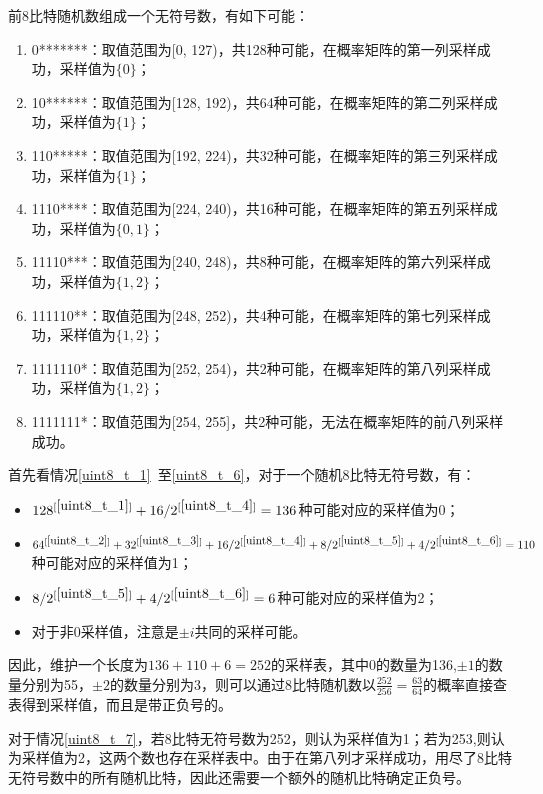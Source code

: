 \documentclass{article}
\begin{document}
	
	前8比特随机数组成一个无符号数，有如下可能：
	\begin{enumerate}
		\item 0*******：取值范围为[0, 127)，共128种可能，在概率矩阵的第一列采样成功，采样值为$\{0\}$；\label{uint8_t_1}
		\item 10******：取值范围为[128, 192)，共64种可能，在概率矩阵的第二列采样成功，采样值为$\{1\}$；\label{uint8_t_2}
		\item 110*****：取值范围为[192, 224)，共32种可能，在概率矩阵的第三列采样成功，采样值为$\{1\}$；\label{uint8_t_3}
		\item 1110****：取值范围为[224, 240)，共16种可能，在概率矩阵的第五列采样成功，采样值为$\{0, 1\}$；\label{uint8_t_4}
		\item 11110***：取值范围为[240, 248)，共8种可能，在概率矩阵的第六列采样成功，采样值为$\{1, 2\}$；\label{uint8_t_5}
		\item 111110**：取值范围为[248, 252)，共4种可能，在概率矩阵的第七列采样成功，采样值为$\{1, 2\}$；\label{uint8_t_6}
		\item 1111110*：取值范围为[252, 254)，共2种可能，在概率矩阵的第八列采样成功，采样值为$\{1, 2\}$；\label{uint8_t_7}
		\item 1111111*：取值范围为[254, 255]，共2种可能，无法在概率矩阵的前八列采样成功。\label{uint8_t_8}
	\end{enumerate}
	首先看情况\ref{uint8_t_1}~至\ref{uint8_t_6}，对于一个随机8比特无符号数，有：
	\begin{itemize}
		\item $128^{[\ref{uint8_t_1}]} + 16/2^{[\ref{uint8_t_4}]} = 136$种可能对应的采样值为0；
		\item $64^{[\ref{uint8_t_2}]} + 32^{[\ref{uint8_t_3}]} + 16/2^{[\ref{uint8_t_4}]} + 8/2^{[\ref{uint8_t_5}]} + 4/2^{[\ref{uint8_t_6}]} = 110$种可能对应的采样值为1；
		\item $8/2^{[\ref{uint8_t_5}]} + 4/2^{[\ref{uint8_t_6}]} = 6$种可能对应的采样值为2；
		\item 对于非0采样值，注意是$\pm i$共同的采样可能。
	\end{itemize}
	因此，维护一个长度为$136 + 110 + 6 = 252$的采样表，其中0的数量为136,$\pm1$的数量分别为55，$\pm2$的数量分别为3，则可以通过8比特随机数以$\frac{252}{256} = \frac{63}{64}$的概率直接查表得到采样值，而且是带正负号的。
	
	对于情况\ref{uint8_t_7}，若8比特无符号数为252，则认为采样值为1；若为253,则认为采样值为2，这两个数也存在采样表中。由于在第八列才采样成功，用尽了8比特无符号数中的所有随机比特，因此还需要一个额外的随机比特确定正负号。
	
\end{document}
